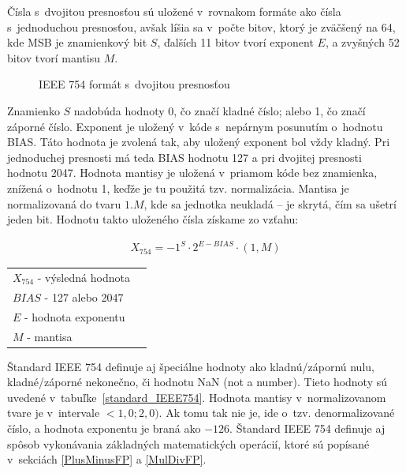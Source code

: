 Čísla s~dvojitou presnosťou sú uložené v~rovnakom formáte ako čísla s~jednoduchou presnosťou, avšak líšia sa v~počte bitov, ktorý je zväčšený na 64, kde MSB je znamienkový bit $ S $, ďalších 11 bitov tvorí exponent $ E $, a zvyšných 52 bitov tvorí mantisu $ M $.

\bigskip
\begin{figure}[h]
\centering
{}
\caption{IEEE 754 formát s~dvojitou presnosťou}
\label{formatFP64}
\end{figure}

Znamienko $ S $ nadobúda hodnoty 0, čo značí kladné číslo; alebo 1, čo značí záporné číslo. Exponent je uložený v~kóde s~nepárnym posunutím o~hodnotu BIAS. Táto hodnota je zvolená tak, aby uložený exponent bol vždy kladný. Pri jednoduchej presnosti má teda BIAS hodnotu 127 a pri dvojitej presnosti hodnotu 2047.
\newpage
Hodnota mantisy je uložená v~priamom kóde bez znamienka, znížená o~hodnotu 1, keďže je tu použitá tzv. normalizácia. Mantisa je normalizovaná do tvaru $ 1.M $, kde sa jednotka neukladá -- je skrytá, čím sa ušetrí jeden bit. Hodnotu takto uloženého čísla získame zo vzťahu:

\begin{eqnarray}
X_{754} = -1^{S}\cdot 2^{E-BIAS}\cdot (1,M)
\end{eqnarray}

\begin{tabular}{ll}
$ X_{754} $ - výsledná hodnota \\
$ BIAS $ - 127 alebo 2047 \\
$ E $ - hodnota exponentu \\
$ M $ - mantisa \\
\end{tabular}
\bigskip

Štandard IEEE 754 definuje aj špeciálne hodnoty ako kladnú/zápornú nulu, kladné/záporné nekonečno, či hodnotu NaN (not a number). Tieto hodnoty sú uvedené v~tabuľke~\ref{standard_IEEE754}.
Hodnota mantisy v~normalizovanom tvare je v~intervale $ <1,0; 2,0) $. Ak tomu tak nie je, ide o~tzv. denormalizované číslo, a hodnota exponentu je braná ako $ -126 $. Štandard IEEE 754 definuje aj spôsob vykonávania základných matematických operácií, ktoré sú popísané v~sekciách \ref{PlusMinusFP} a \ref{MulDivFP}.

